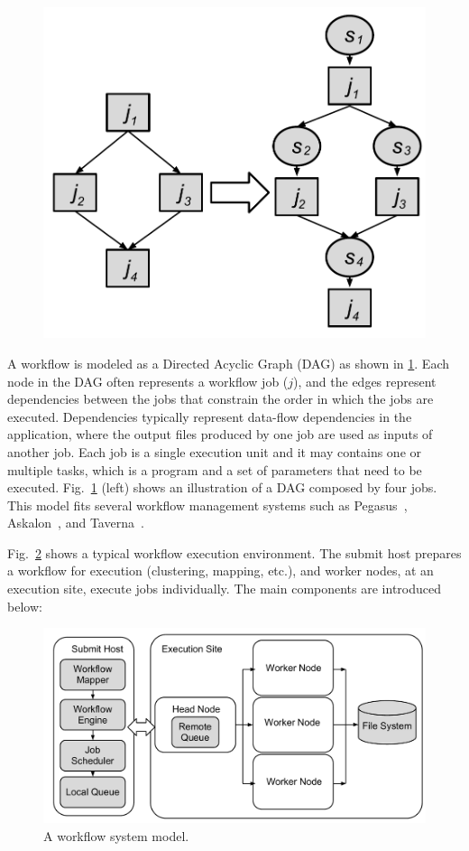\documentclass[final]{IEEEtran}
\begin{document}
\begin{figure}[htb]
	\centering
	\includegraphics[width=0.7\linewidth]{figure/odag.pdf}
	\label{fig:odag}
	\vspace{-10pt}
\end{figure}
A workflow is modeled as a Directed Acyclic Graph (DAG) as shown in \ref{fig:odag}. Each node in the DAG often represents a workflow job ($j$), and the edges represent dependencies between the jobs that constrain the order in which the jobs are executed. Dependencies typically represent data-flow dependencies in the application, where the output files produced by one job are used as inputs of another job. Each job is a single execution unit and it may contains one or multiple tasks, which is a program and a set of parameters that need to be executed. Fig.~\ref{fig:odag} (left) shows an illustration of a DAG composed by four jobs. This model fits several workflow management systems such as Pegasus~\cite{Deelman2005}, Askalon~\cite{Fahringer2005}, and Taverna~\cite{Oinn:2006:TLC:1148437.1148448}.


Fig.~\ref{fig:system} shows a typical workflow execution environment. The submit host prepares a workflow for execution (clustering, mapping, etc.), and worker nodes, at an execution site, execute jobs individually. The main components are introduced below:

\begin{figure}[htb]
\centering
  \includegraphics[width=0.95\linewidth]{figure/execution.pdf}
  \caption{A workflow system model.}
  \label{fig:system}
  \vspace{-10pt}
\end{figure}
\end{document}
